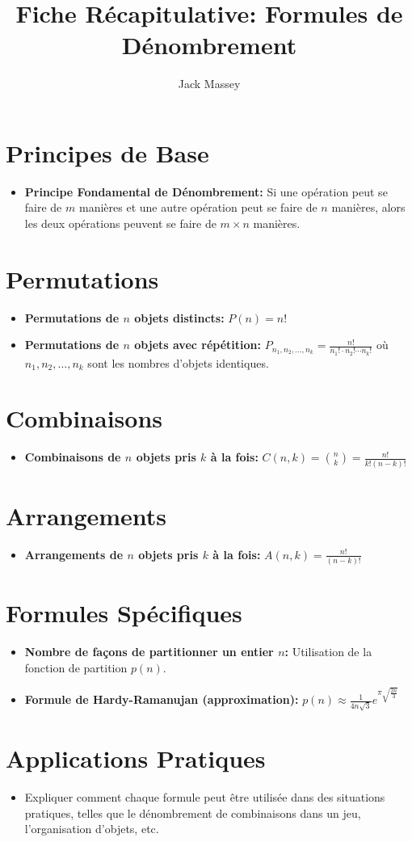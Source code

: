 \documentclass{article}
\title{Fiche Récapitulative: Formules de Dénombrement}
\author{Jack Massey}
\date{}
\begin{document}
\maketitle

\section{Principes de Base}
\begin{itemize}
    \item \textbf{Principe Fondamental de Dénombrement:} Si une opération peut se faire de \(m\) manières et une autre opération peut se faire de \(n\) manières, alors les deux opérations peuvent se faire de \(m \times n\) manières.
\end{itemize}

\section{Permutations}
\begin{itemize}
    \item \textbf{Permutations de \(n\) objets distincts:} \(P(n) = n!\)
    \item \textbf{Permutations de \(n\) objets avec répétition:} \(P_{n_1, n_2, \ldots, n_k} = \frac{n!}{n_1! \cdot n_2! \cdots n_k!}\) où \(n_1, n_2, \ldots, n_k\) sont les nombres d'objets identiques.
\end{itemize}

\section{Combinaisons}
\begin{itemize}
    \item \textbf{Combinaisons de \(n\) objets pris \(k\) à la fois:} \(C(n, k) = \binom{n}{k} = \frac{n!}{k!(n-k)!}\)
\end{itemize}

\section{Arrangements}
\begin{itemize}
    \item \textbf{Arrangements de \(n\) objets pris \(k\) à la fois:} \(A(n, k) = \frac{n!}{(n-k)!}\)
\end{itemize}

\section{Formules Spécifiques}
\begin{itemize}
    \item \textbf{Nombre de façons de partitionner un entier \(n\):} Utilisation de la fonction de partition \(p(n)\).
    \item \textbf{Formule de Hardy-Ramanujan (approximation):} \(p(n) \approx \frac {1} {4n\sqrt{3}} e^{\pi \sqrt{\frac{2n}{3}}}\)
\end{itemize}

\section{Applications Pratiques}
\begin{itemize}
    \item Expliquer comment chaque formule peut être utilisée dans des situations pratiques, telles que le dénombrement de combinaisons dans un jeu, l'organisation d'objets, etc.
\end{itemize}
\end{document}
